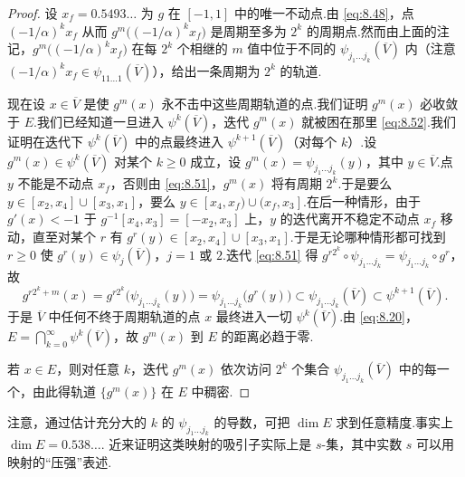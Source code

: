 \begin{proof}
设 $x_f=0.5493\ldots$ 为 $g$ 在 $[-1,1]$ 中的唯一不动点.由 \eqref{eq:8.48}，点 $(-1/\alpha)^k x_f$ 从而 $g^m\bigl((-1/\alpha)^k x_f\bigr)$ 是周期至多为 $2^k$ 的周期点.然而由上面的注记，$g^m\bigl((-1/\alpha)^kx_f\bigr)$ 在每 $2^k$ 个相继的 $m$ 值中位于不同的 $\psi_{j_1\ldots j_k}(\overline{V})$ 内（注意 $(-1/\alpha)^kx_f\in\psi_{11\ldots1}(\overline{V})$），给出一条周期为 $2^k$ 的轨道.

现在设 $x\in\overline{V}$ 是使 $g^m(x)$ 永不击中这些周期轨道的点.我们证明 $g^m(x)$ 必收敛于 $E$.我们已经知道一旦进入 $\psi^k(\overline{V})$，迭代 $g^m(x)$ 就被困在那里 \eqref{eq:8.52}.我们证明在迭代下 $\psi^k(\overline{V})$ 中的点最终进入 $\psi^{k+1}(\overline{V})$（对每个 $k$）.设 $g^m(x)\in\psi^k(\overline{V})$ 对某个 $k\geq 0$ 成立，设 $g^m(x)=\psi_{j_1\ldots j_k}(y)$，其中 $y\in\overline{V}$.点 $y$ 不能是不动点 $x_f$，否则由 \eqref{eq:8.51}，$g^m(x)$ 将有周期 $2^k$.于是要么 $y\in[x_2,x_4]\cup[x_3,x_1]$，要么 $y\in[x_4,x_f)\cup(x_f,x_3]$.在后一种情形，由于 $g'(x)<-1$ 于 $g^{-1}[x_4,x_3]=[-x_2,x_3]$ 上，$y$ 的迭代离开不稳定不动点 $x_f$ 移动，直至对某个 $r$ 有 $g^r(y)\in[x_2,x_4]\cup[x_3,x_1]$.于是无论哪种情形都可找到 $r\geq 0$ 使 $g^r(y)\in\psi_j(\overline{V})$，$j=1$ 或 $2$.迭代 \eqref{eq:8.51} 得 $g^{r2^k}\circ\psi_{j_1\ldots j_k}=\psi_{j_1\ldots j_k}\circ g^r$，故
\[
  g^{r2^{k}+m}(x)
  =g^{r2^{k}}\bigl(\psi_{j_1\ldots j_k}(y)\bigr)
  =\psi_{j_1\ldots j_k}\bigl(g^{r}(y)\bigr)
  \subset\psi_{j_1\ldots j_k}(\overline{V})
  \subset\psi^{k+1}(\overline{V}).
\]
于是 $\overline{V}$ 中任何不终于周期轨道的点 $x$ 最终进入一切 $\psi^k(\overline{V})$.由 \eqref{eq:8.20}，$E=\bigcap_{k=0}^{\infty}\psi^k(\overline{V})$，故 $g^m(x)$ 到 $E$ 的距离必趋于零.

若 $x\in E$，则对任意 $k$，迭代 $g^m(x)$ 依次访问 $2^k$ 个集合 $\psi_{j_1\ldots j_k}(\overline{V})$ 中的每一个，由此得轨道 $\{g^m(x)\}$ 在 $E$ 中稠密.
\end{proof}

注意，通过估计充分大的 $k$ 的 $\psi_{j_1\ldots j_k}$ 的导数，可把 $\dim E$ 求到任意精度.事实上 $\dim E=0.538\ldots$.\textcite{ruelle1983} 近来证明这类映射的吸引子实际上是 $s$-集，其中实数 $s$ 可以用映射的``压强''表述.

